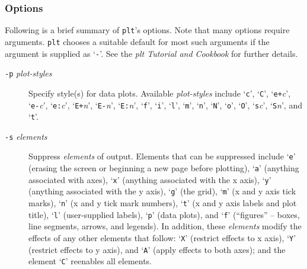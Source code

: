 \subsubsection*{Options}Following is a brief summary of
\texttt{plt}'s options.  Note that many options require arguments.  \texttt{plt} chooses a suitable
default for most such arguments if the argument is supplied as `\texttt{-}'.  See the
\textit{plt Tutorial and Cookbook} for further details. \begin{description}
\item [\texttt{-p}\textit{ plot-styles} ] Specify style(s)
for data plots.  Available \textit{plot-styles} include `\texttt{c}', `\texttt{C}', `\texttt{e+}\textit{c}', `\texttt{e-}\textit{c}', `\texttt{e:}\textit{c}', `\texttt{E+}\textit{n}', `\texttt{E-}\textit{n}',
`\texttt{E:}\textit{n}', `\texttt{f}', `\texttt{i}', `\texttt{l}', `\texttt{m}', `\texttt{n}', `\texttt{N}', `\texttt{o}', `\texttt{O}', `\texttt{s}\textit{c}', `\texttt{S}\textit{n}', and `\texttt{t}'. 
\item [\texttt{-s}\textit{ elements} ] Suppress \textit{elements}
of output.  Elements that can be suppressed include `\texttt{e}' (erasing the screen
or beginning a new page before plotting), `\texttt{a}' (anything associated with axes),
`\texttt{x}' (anything associated with the x axis), `\texttt{y}' (anything associated with the
y axis), `\texttt{g}' (the grid), `\texttt{m}' (x and y axis tick marks), `\texttt{n}' (x and y tick mark
numbers), `\texttt{t}' (x and y axis labels and plot title), `\texttt{l}' (user-supplied labels),
`\texttt{p}' (data plots), and `\texttt{f}' (``figures'' -- boxes, line segments, arrows, and legends).
In addition, these \textit{elements} modify the effects of any other elements that
follow:  `\texttt{X}' (restrict effects to x axis), `\texttt{Y}' (restrict effects to y axis),
and `\texttt{A}' (apply effects to both axes);  and the element `\texttt{C}' reenables all elements.


\end{description}
